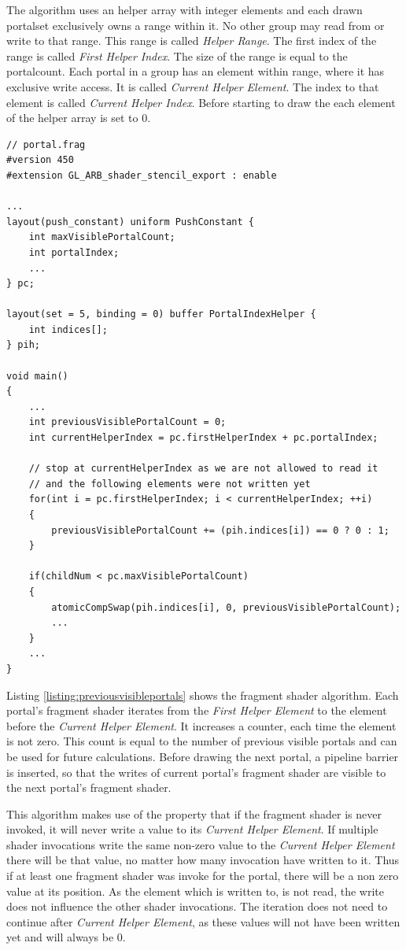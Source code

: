 The algorithm uses an helper array with integer elements and each drawn \gls{portalset} exclusively owns a range within it. No other group may read from or write to that range. This range is called \textit{Helper Range}. The first index of the range is called \textit{First Helper Index}. The size of the range is equal to the \gls{portalcount}. Each portal in a group has an element within range, where it has exclusive write access. It is called \textit{Current Helper Element}. The index to that element is called \textit{Current Helper Index}. Before starting to draw the each element of the helper array is set to 0.

\begin{lstlisting}[caption={Calculate Previous Visible Portals}, label=listing:previousvisibleportals]
// portal.frag
#version 450
#extension GL_ARB_shader_stencil_export : enable

...
layout(push_constant) uniform PushConstant {	
	int maxVisiblePortalCount;
	int portalIndex;
	...
} pc;

layout(set = 5, binding = 0) buffer PortalIndexHelper {
	int indices[];
} pih;

void main()
{
	...
	int previousVisiblePortalCount = 0;
	int currentHelperIndex = pc.firstHelperIndex + pc.portalIndex;
	
	// stop at currentHelperIndex as we are not allowed to read it
	// and the following elements were not written yet
	for(int i = pc.firstHelperIndex; i < currentHelperIndex; ++i)
	{
		previousVisiblePortalCount += (pih.indices[i]) == 0 ? 0 : 1;
	}
	
	if(childNum < pc.maxVisiblePortalCount)
	{
		atomicCompSwap(pih.indices[i], 0, previousVisiblePortalCount);
		...
	}
	...
}
\end{lstlisting}

Listing \ref{listing:previousvisibleportals} shows the fragment shader algorithm. Each portal's fragment shader iterates from the \textit{First Helper Element} to the element before the \textit{Current Helper Element}. It increases a counter, each time the element is not zero. This count is equal to the number of previous visible portals and can be used for future calculations. Before drawing the next portal, a pipeline barrier is inserted, so that the writes of current portal's fragment shader are visible to the next portal's fragment shader.

This algorithm makes use of the property that if the fragment shader is never invoked, it will never write a value to its \textit{Current Helper Element}. If multiple shader invocations write the same non-zero value to the \textit{Current Helper Element} there will be that value, no matter how many invocation have written to it.
Thus if at least one fragment shader was invoke for the portal, there will be a non zero value at its position. As the element which is written to, is not read, the write does not influence the other shader invocations. The iteration does not need to continue after \textit{Current Helper Element}, as these values will not have been written yet and will always be 0.


